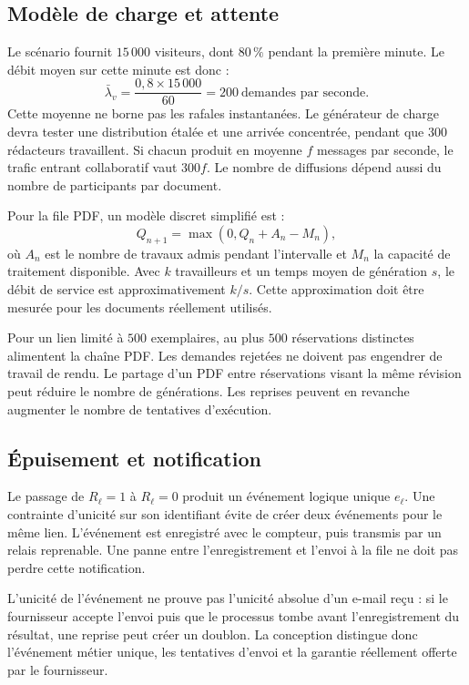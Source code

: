 \subsection{Modèle de charge et attente}
Le scénario fournit $15\,000$ visiteurs, dont $80\,\%$ pendant la première minute. Le débit moyen sur cette minute est donc :
\begin{equation}
\bar\lambda_v=\frac{0{,}8\times15\,000}{60}=200\ \text{demandes par seconde}.
\end{equation}
Cette moyenne ne borne pas les rafales instantanées. Le générateur de charge devra tester une distribution étalée et une arrivée concentrée, pendant que $300$ rédacteurs travaillent. Si chacun produit en moyenne $f$ messages par seconde, le trafic entrant collaboratif vaut $300f$. Le nombre de diffusions dépend aussi du nombre de participants par document.

Pour la file PDF, un modèle discret simplifié est :
\begin{equation}
Q_{n+1}=\max(0,Q_n+A_n-M_n),
\end{equation}
où $A_n$ est le nombre de travaux admis pendant l'intervalle et $M_n$ la capacité de traitement disponible. Avec $k$ travailleurs et un temps moyen de génération $s$, le débit de service est approximativement $k/s$. Cette approximation doit être mesurée pour les documents réellement utilisés.

Pour un lien limité à $500$ exemplaires, au plus $500$ réservations distinctes alimentent la chaîne PDF. Les demandes rejetées ne doivent pas engendrer de travail de rendu. Le partage d'un PDF entre réservations visant la même révision peut réduire le nombre de générations. Les reprises peuvent en revanche augmenter le nombre de tentatives d'exécution.

\subsection{Épuisement et notification}
Le passage de $R_\ell=1$ à $R_\ell=0$ produit un événement logique unique $e_\ell$. Une contrainte d'unicité sur son identifiant évite de créer deux événements pour le même lien. L'événement est enregistré avec le compteur, puis transmis par un relais reprenable. Une panne entre l'enregistrement et l'envoi à la file ne doit pas perdre cette notification.

L'unicité de l'événement ne prouve pas l'unicité absolue d'un e-mail reçu : si le fournisseur accepte l'envoi puis que le processus tombe avant l'enregistrement du résultat, une reprise peut créer un doublon. La conception distingue donc l'événement métier unique, les tentatives d'envoi et la garantie réellement offerte par le fournisseur.

